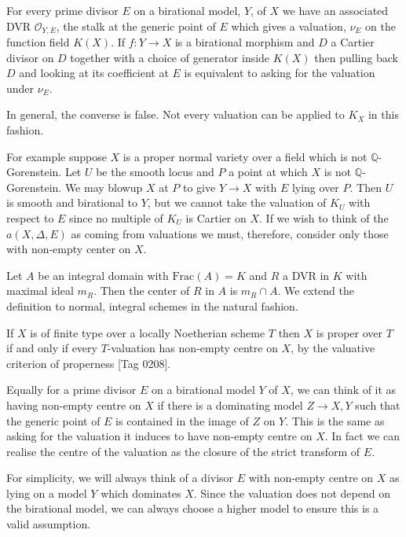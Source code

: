 \documentclass[a4paper,12pt]{book}
\begin{document}
For every prime divisor $E$ on a birational model, $Y$, of $X$ we have an associated DVR $\mathcal{O}_{Y,E}$, the stalk at the generic point of $E$ which gives a valuation, $\nu_{E}$ on the function field $K(X)$. If $f:Y \to X$ is a birational morphism and $D$ a Cartier divisor on $D$ together with a choice of generator inside $K(X)$ then pulling back $D$ and looking at its coefficient at $E$ is equivalent to asking for the valuation under $\nu_{E}$. 

In general, the converse is false. Not every valuation can be applied to $K_{X}$ in this fashion.

For example suppose $X$ is a proper normal variety over a field which is not $\mathbb{Q}$-Gorenstein. Let $U$ be the smooth locus and $P$ a point at which $X$ is not $\mathbb{Q}$-Gorenstein. We may blowup $X$ at $P$ to give $Y \to X$ with $E$ lying over $P$. Then $U$ is smooth and birational to $Y$, but we cannot take the valuation of $K_{U}$ with respect to $E$ since no multiple of $K_{U}$ is Cartier on $X$. If we wish to think of the $a(X,\Delta,E)$ as coming from valuations we must, therefore, consider only those with non-empty center on $X$. 

\begin{definition}
	Let $A$ be an integral domain with $\text{Frac}(A)=K$ and $R$ a DVR in $K$ with maximal ideal $m_{R}$. Then the center of $R$ in $A$ is $m_{R}\cap A$. We extend the definition to normal, integral schemes in the natural fashion.
\end{definition}

If $X$ is of finite type over a locally Noetherian scheme $T$ then $X$ is proper over $T$ if and only if every $T$-valuation has non-empty centre on $X$, by the valuative criterion of properness \cite{stacks-project}[Tag 0208]. 

Equally for a prime divisor $E$ on a birational model $Y$ of $X$, we can think of it as having non-empty centre on $X$ if there is a dominating model $Z \to X,Y$ such that the generic point of $E$ is contained in the image of $Z$ on $Y$. This is the same as asking for the valuation it induces to have non-empty centre on $X$. In fact we can realise the centre of the valuation as the closure of the strict transform of $E$.

For simplicity, we will always think of a divisor $E$ with non-empty centre on $X$ as lying on a model $Y$ which dominates $X$. Since the valuation does not depend on the birational model, we can always choose a higher model to ensure this is a valid assumption. 
\end{document}
